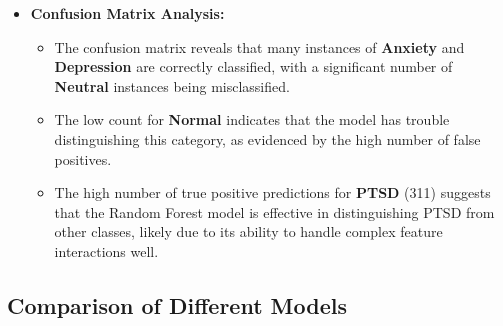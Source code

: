 \begin{itemize}
    \item \textbf{Confusion Matrix Analysis:}
    \begin{itemize}
        \item The confusion matrix reveals that many instances of \textbf{Anxiety} and \textbf{Depression} are correctly classified, with a significant number of \textbf{Neutral} instances being misclassified.
        \item The low count for \textbf{Normal} indicates that the model has trouble distinguishing this category, as evidenced by the high number of false positives.
        \item The high number of true positive predictions for \textbf{PTSD} (311) suggests that the Random Forest model is effective in distinguishing PTSD from other classes, likely due to its ability to handle complex feature interactions well.
    \end{itemize}
\end{itemize}

\subsection{Comparison of Different Models}

